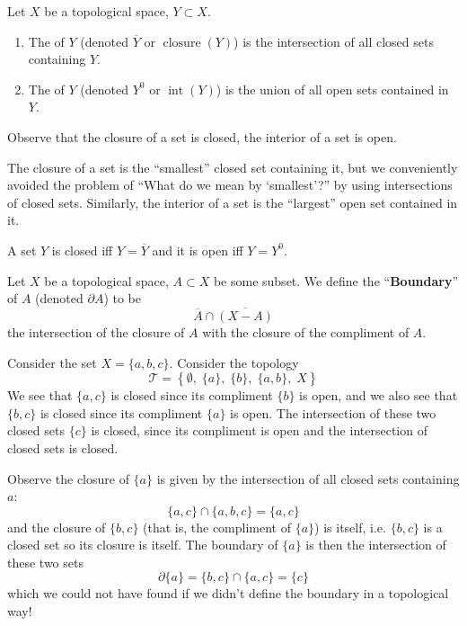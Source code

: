 \begin{defn}
Let $X$ be a topological space, $Y\subset X$.
\begin{enumerate}
\item The  of $Y$ (denoted $\overline{Y}$ or
  $\operatorname{closure}(Y)$) is the intersection of all closed sets
  containing $Y$.
\item The  of $Y$ (denoted $Y^0$ or
  $\operatorname{int}(Y)$) is the union of all open sets contained in
  $Y$.
\end{enumerate}
\end{defn}
\begin{rmk}
Observe that the closure of a set is closed, the interior of a set is open.
\end{rmk}
\begin{rmk}
The closure of a set is the ``smallest'' closed set containing it, but
we conveniently avoided the problem of ``What do we mean by
`smallest'?'' by using intersections of closed sets. Similarly, the
interior of a set is the ``largest'' open set contained in it.
\end{rmk}
\begin{rmk}
A set $Y$ is closed iff $Y=\overline{Y}$ and it is open iff $Y=Y^0$.
\end{rmk}
\begin{defn}
Let $X$ be a topological space, $A\subset X$ be some subset. We define
the ``\textbf{Boundary}'' of $A$ (denoted $\partial A$) to be
\begin{equation}
\overline{A}\cap\overline{(X-A)}
\end{equation}
the intersection of the closure of $A$ with the closure of the
compliment of $A$.
\end{defn}
\begin{ex}
Consider the set $X=\{a,b,c\}$. Consider the topology
\begin{equation}
\mathcal{T} = \left\{\emptyset,\;\{a\},\; \{b\},\; \{a,b\},\; X\right\}
\end{equation}
We see that $\{a,c\}$ is closed since its compliment $\{b\}$ is open,
and we also see that $\{b,c\}$ is closed since its compliment $\{a\}$
is open. The intersection of these two closed sets $\{c\}$ is closed,
since its compliment is open and the intersection of closed sets is
closed.

Observe the closure of $\{a\}$ is given by the intersection of
all closed sets containing $a$:
\begin{equation}
\{a,c\}\cap\{a,b,c\}=\{a,c\}
\end{equation}
and the closure of $\{b,c\}$ (that is, the compliment of $\{a\}$) is
itself, i.e. $\{b,c\}$ is a closed set so its closure is itself. The
boundary of $\{a\}$ is then the intersection of these two sets
\begin{equation}
\partial \{a\} = \{b,c\}\cap\{a,c\} = \{c\}
\end{equation}
which we could not have found if we didn't define the boundary in a
topological way!
\end{ex}
